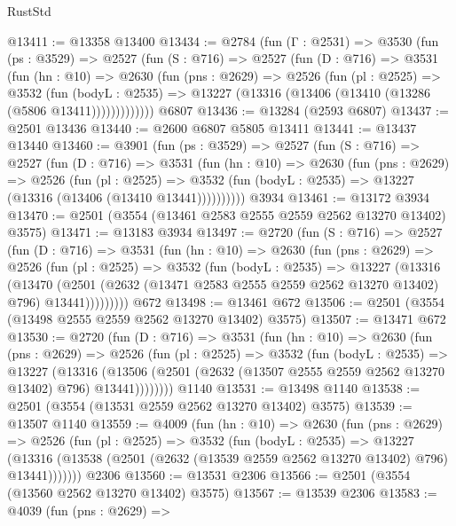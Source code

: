 \begin{lexlean}{RustStd}
\begin{coremodule}
@13411 := @13358 @13400
@13434 := @2784
    (fun (Γ : @2531) =>
    @3530
      (fun (ps : @3529) =>
      @2527
        (fun (S : @716) =>
        @2527
          (fun (D : @716) =>
          @3531
            (fun (hn : @10) =>
            @2630
              (fun (pns : @2629) =>
              @2526
                (fun (pl : @2525) =>
                @3532
                  (fun (bodyL : @2535) =>
                  @13227 (@13316 (@13406 (@13410 (@13286 (@5806 @13411)))))))))))))
    @6807
@13436 := @13284 (@2593 @6807)
@13437 := @2501 @13436
@13440 := @2600 @6807 @5805 @13411
@13441 := @13437 @13440
@13460 := @3901
    (fun (ps : @3529) =>
    @2527
      (fun (S : @716) =>
      @2527
        (fun (D : @716) =>
        @3531
          (fun (hn : @10) =>
          @2630
            (fun (pns : @2629) =>
            @2526
              (fun (pl : @2525) =>
              @3532 (fun (bodyL : @2535) => @13227 (@13316 (@13406 (@13410 @13441))))))))))
    @3934
@13461 := @13172 @3934
@13470 := @2501 (@3554 (@13461 @2583 @2555 @2559 @2562 @13270 @13402) @3575)
@13471 := @13183 @3934
@13497 := @2720
    (fun (S : @716) =>
    @2527
      (fun (D : @716) =>
      @3531
        (fun (hn : @10) =>
        @2630
          (fun (pns : @2629) =>
          @2526
            (fun (pl : @2525) =>
            @3532
              (fun (bodyL : @2535) =>
              @13227
                (@13316
                  (@13470
                    (@2501
                      (@2632 (@13471 @2583 @2555 @2559 @2562 @13270 @13402) @796)
                      @13441)))))))))
    @672
@13498 := @13461 @672
@13506 := @2501 (@3554 (@13498 @2555 @2559 @2562 @13270 @13402) @3575)
@13507 := @13471 @672
@13530 := @2720
    (fun (D : @716) =>
    @3531
      (fun (hn : @10) =>
      @2630
        (fun (pns : @2629) =>
        @2526
          (fun (pl : @2525) =>
          @3532
            (fun (bodyL : @2535) =>
            @13227
              (@13316
                (@13506 (@2501 (@2632 (@13507 @2555 @2559 @2562 @13270 @13402) @796) @13441))))))))
    @1140
@13531 := @13498 @1140
@13538 := @2501 (@3554 (@13531 @2559 @2562 @13270 @13402) @3575)
@13539 := @13507 @1140
@13559 := @4009
    (fun (hn : @10) =>
    @2630
      (fun (pns : @2629) =>
      @2526
        (fun (pl : @2525) =>
        @3532
          (fun (bodyL : @2535) =>
          @13227
            (@13316 (@13538 (@2501 (@2632 (@13539 @2559 @2562 @13270 @13402) @796) @13441)))))))
    @2306
@13560 := @13531 @2306
@13566 := @2501 (@3554 (@13560 @2562 @13270 @13402) @3575)
@13567 := @13539 @2306
@13583 := @4039
    (fun (pns : @2629) =>

\end{coremodule}
\end{lexlean}

